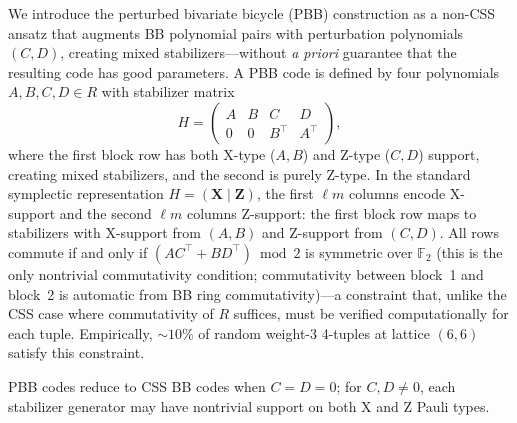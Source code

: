 \documentclass[aps,prxquantum,twocolumn,superscriptaddress,nofootinbib]{revtex4-2}
\newcommand{\FF}{\ensuremath{\mathbb{F}}}
\begin{document}
We introduce the perturbed bivariate bicycle (PBB) construction as a non-CSS ansatz that augments BB polynomial pairs with perturbation polynomials $(C, D)$, creating mixed stabilizers---without \emph{a priori} guarantee that the resulting code has good parameters.
A PBB code is defined by four polynomials $A, B, C, D \in R$ with stabilizer matrix
\begin{equation}
H = \begin{pmatrix} A & B & C & D \\ 0 & 0 & B^\top & A^\top \end{pmatrix},
\end{equation}
where the first block row has both X-type ($A,B$) and Z-type ($C,D$) support, creating mixed stabilizers, and the second is purely Z-type.
In the standard symplectic representation $H = (\mathbf{X} \mid \mathbf{Z})$, the first $\ell m$ columns encode X-support and the second $\ell m$ columns Z-support: the first block row maps to stabilizers with X-support from $(A,B)$ and Z-support from $(C,D)$.
All rows commute if and only if $(AC^\top + BD^\top) \bmod 2$ is symmetric over $\FF_2$ (this is the only nontrivial commutativity condition; commutativity between block~1 and block~2 is automatic from BB ring commutativity)---a constraint that, unlike the CSS case where commutativity of $R$ suffices, must be verified computationally for each tuple.
Empirically, ${\sim}10\%$ of random weight-3 4-tuples at lattice $(6,6)$ satisfy this constraint.

PBB codes reduce to CSS BB codes when $C = D = 0$; for $C, D \neq 0$, each stabilizer generator may have nontrivial support on both X and Z Pauli types.
\end{document}
